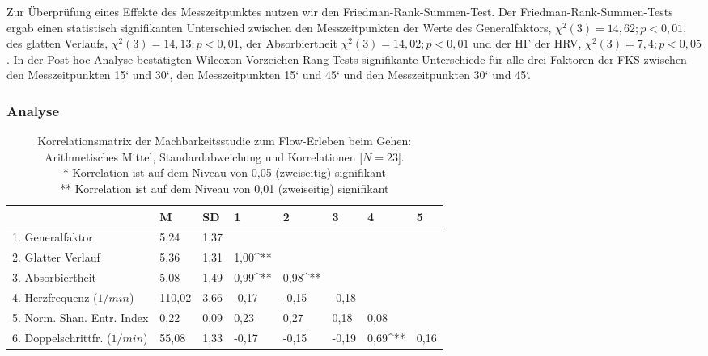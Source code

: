 Zur Überprüfung eines Effekte des Messzeitpunktes nutzen wir den Friedman-Rank-Summen-Test. Der Friedman-Rank-Summen-Tests ergab einen statistisch signifikanten Unterschied zwischen den Messzeitpunkten der Werte des Generalfaktors, $\chi^2 (3) = 14{,}62; p < 0{,}01$, des glatten Verlaufs, $\chi^2 (3) = 14{,}13; p < 0{,}01$, der Absorbiertheit $\chi^2 (3) = 14{,}02; p < 0{,}01$ und der \acs{HF} der \ac{HRV}, $\chi^2 (3) = 7{,}4; p < 0{,}05$. In der Post-hoc-Analyse bestätigten Wilcoxon-Vorzeichen-Rang-Tests signifikante Unterschiede für alle drei Faktoren der \ac{FKS} zwischen den Messzeitpunkten 15‘ und 30‘, den Messzeitpunkten 15‘ und 45‘ und den Messzeitpunkten 30‘ und 45‘. 

\subsubsection{Analyse} 

\label{subs:analyse_5_2} 
\begin{sidewaystable}
	\centering \caption[Korrelationsmatrix (Machbarkeitsstudie: Gehen).]{Korrelationsmatrix der Machbarkeitsstudie zum Flow-Erleben beim Gehen: Arithmetisches Mittel, Standardabweichung und Korrelationen [$N = 23$].\\
	\hspace{ 
	\textwidth}* Korrelation ist auf dem Niveau von 0,05 (zweiseitig) signifikant \\
	\hspace{ 
	\textwidth}** Korrelation ist auf dem Niveau von 0,01 (zweiseitig) signifikant} \label{tab:korrelationen_2} 
	\begin{tabular}
		{lxxxxxxx} \toprule & M & SD & 1 & 2 & 3 & 4 & 5 \\
		. Generalfaktor & 5,24 & 1,37 & & & & & \\
		2. Glatter Verlauf & 5,36 & 1,31 & 1,00^{**} & & & & \\
		3. Absorbiertheit & 5,08 & 1,49 & 0,99^{**} & 0,98^{**} & & & \\
		4. Herzfrequenz ($1/min$) & 110,02 & 3,66 & -0,17 & -0,15 & -0,18 & & \\
		5. Norm. Shan. Entr. Index & 0,22 & 0,09 & 0,23 & 0,27 & 0,18 & 0,08 & \\
		6. Doppelschrittfr. ($1/min$) & 55,08 & 1,33 & -0,17 & -0,15 & -0,19 & 0,69^{**} & 0,16 \\
		\bottomrule 
	\end{tabular}
\end{sidewaystable}

